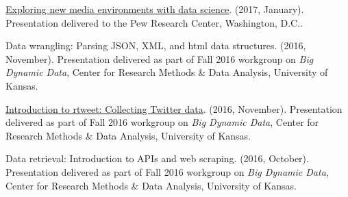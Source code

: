 \begin{bibenum}
    \item[] \href{https://mkearney.github.io/research_talk/pewtalk.html}{Exploring new media environments with data science}. (2017, January).
      Presentation delivered to the Pew Research Center, Washington, D.C..
    \item[] Data wrangling: Parsing JSON, XML, and html data structures. (2016, November).
      Presentation delivered as part of Fall 2016 workgroup on \textit{Big Dynamic Data},
      Center for Research Methods \& Data Analysis, University of Kansas.
    \item[] \href{https://github.com/mkearney/bigdata-workgroup}{Introduction to rtweet: Collecting Twitter data}. (2016, November).
      Presentation delivered as part of Fall 2016 workgroup on \textit{Big Dynamic Data},
      Center for Research Methods \& Data Analysis, University of Kansas.
    \item[] Data retrieval: Introduction to APIs and web scraping. (2016, October).
      Presentation delivered as part of Fall 2016 workgroup on \textit{Big Dynamic Data},
      Center for Research Methods \& Data Analysis, University of Kansas.
  \end{bibenum}
